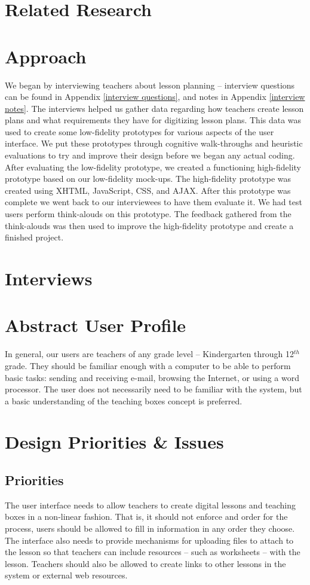 \documentclass[10pt,letter]{article}
\begin{document}
\section{Related Research}

\section{Approach}
We began by interviewing teachers about lesson planning -- interview questions
can be found in Appendix \ref{interview questions}, and notes in Appendix
\ref{interview notes}. The interviews helped us gather data regarding how
teachers create lesson plans and what requirements they have for digitizing
lesson plans. This data was used to create some low-fidelity prototypes for
various aspects of the user interface. We put these prototypes through cognitive
walk-throughs and heuristic evaluations to try and improve their design before
we began any actual coding. After evaluating the low-fidelity prototype, we
created a functioning high-fidelity prototype based on our low-fidelity
mock-ups. The high-fidelity prototype was created using XHTML, JavaScript, CSS,
and AJAX. After this prototype was complete we went back to our interviewees to
have them evaluate it. We had test users perform think-alouds on this prototype.
The feedback gathered from the think-alouds was then used to improve the
high-fidelity prototype and create a finished project.

\section{Interviews}


\section{Abstract User Profile}
In general, our users are teachers of any grade level -- Kindergarten through
12$^{th}$ grade. They should be familiar enough with a computer to be able to
perform basic tasks: sending and receiving e-mail, browsing the Internet, or
using a word processor. The user does not necessarily need to be familiar with
the system, but a basic understanding of the teaching boxes concept is
preferred.

\section{Design Priorities \& Issues}
\subsection{Priorities}
The user interface needs to allow teachers to create digital lessons and
teaching boxes in a non-linear fashion. That is, it should not enforce and order
for the process, users should be allowed to fill in information in any order
they choose. The interface also needs to provide mechanisms for uploading files
to attach to the lesson so that teachers can include resources -- such as
worksheets -- with the lesson. Teachers should also be allowed to create links
to other lessons in the system or external web resources.
\end{document}
